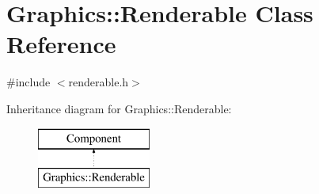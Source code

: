 \hypertarget{class_graphics_1_1_renderable}{}\section{Graphics\+:\+:Renderable Class Reference}
\label{class_graphics_1_1_renderable}


{\ttfamily \#include $<$renderable.\+h$>$}

Inheritance diagram for Graphics\+:\+:Renderable\+:\begin{figure}[H]
\begin{center}
\leavevmode
\includegraphics[height=2.000000cm]{class_graphics_1_1_renderable}
\end{center}
\end{figure}
